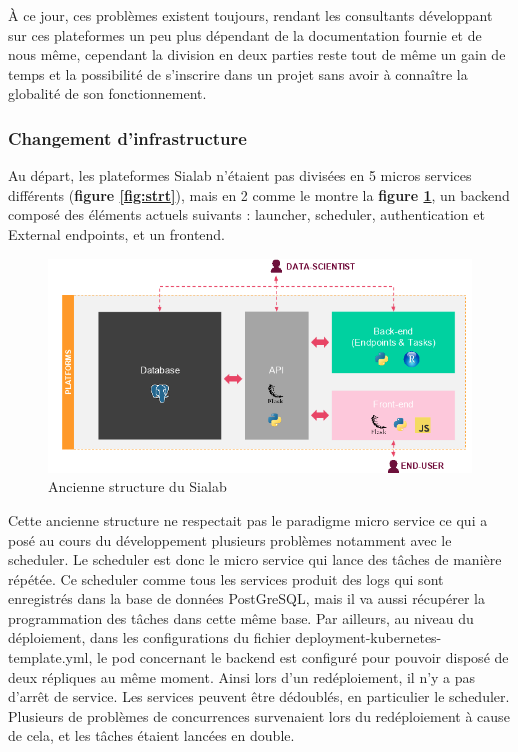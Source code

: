 \documentclass{article} %
\begin{document}
À ce jour, ces problèmes existent toujours, rendant les consultants développant sur ces plateformes un peu plus dépendant de la documentation fournie et de nous même, cependant la division en deux parties reste tout de même un gain de temps et la possibilité de s'inscrire dans un projet sans avoir à connaître la globalité de son fonctionnement.
 
\subsubsection{Changement d'infrastructure}
Au départ, les plateformes Sialab n'étaient pas divisées en 5 micros services différents (\textbf{figure \ref{fig:strt}}), mais en 2 comme le montre la \textbf{figure \ref{fig:strtold}}, un backend composé des éléments actuels suivants : launcher, scheduler, authentication et External endpoints, et un frontend. 

\begin{figure}[!h]
 \centering
 \includegraphics[keepaspectratio = true,scale=0.6]{structancienne.png}
 \caption{Ancienne structure du Sialab}
 \label{fig:strtold}
\end{figure}

Cette ancienne structure ne respectait pas le paradigme micro service ce qui a posé au cours du développement plusieurs problèmes notamment avec le scheduler. Le scheduler est donc le micro service qui lance des tâches de manière répétée. Ce scheduler comme tous les services produit des logs qui sont enregistrés dans la base de données PostGreSQL, mais il va aussi récupérer la programmation des tâches dans cette même base. Par ailleurs, au niveau du déploiement, dans les configurations du fichier deployment-kubernetes-template.yml, le pod concernant le backend est configuré pour pouvoir disposé de deux répliques au même moment. Ainsi lors d'un redéploiement, il n'y a pas d'arrêt de service. Les services peuvent être dédoublés, en particulier le scheduler. Plusieurs de problèmes de concurrences survenaient lors du redéploiement à cause de cela, et les tâches étaient lancées en double.\\
\end{document}
